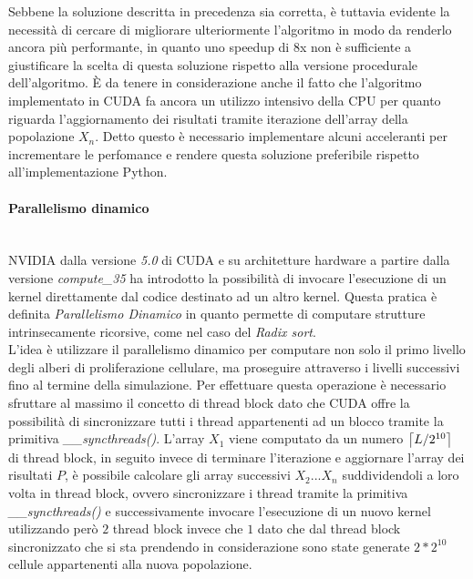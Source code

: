 Sebbene la soluzione descritta in precedenza sia corretta, è tuttavia
evidente la necessità di cercare di migliorare ulteriormente
l'algoritmo in modo da renderlo ancora più performante, in quanto uno
speedup di 8x non è sufficiente a giustificare la scelta di questa soluzione
rispetto alla versione procedurale dell'algoritmo.
È da tenere in considerazione anche il fatto che l'algoritmo implementato
in CUDA fa ancora un utilizzo intensivo della CPU per quanto riguarda
l'aggiornamento dei risultati tramite iterazione dell'array della
popolazione $X_{n}$.
Detto questo è necessario implementare alcuni acceleranti per
incrementare le perfomance e rendere questa soluzione preferibile rispetto
all'implementazione Python.

\paragraph{Parallelismo dinamico}\mbox{}
\\
NVIDIA dalla versione \textit{5.0} di CUDA e su architetture hardware a partire
dalla versione \textit{compute\_35} ha introdotto la possibilità di invocare
l'esecuzione di un kernel direttamente dal codice destinato ad un altro kernel.
Questa pratica è definita
\textit{Parallelismo Dinamico}\cite{jones2012introduction} in quanto permette
di computare strutture intrinsecamente ricorsive, come nel caso del
\textit{Radix sort}\cite{merrill2011high}.
\\
L'idea è utilizzare il parallelismo dinamico per computare non solo il primo
livello degli alberi di proliferazione cellulare, ma proseguire attraverso i
livelli successivi fino al termine della simulazione.
Per effettuare questa operazione è necessario sfruttare al massimo il concetto di
thread block dato che CUDA offre la possibilità di sincronizzare
tutti i thread appartenenti ad un blocco tramite la primitiva
\textit{\_\_syncthreads()}\cite{jones2012introduction}.
L'array $X_{1}$ viene computato da un numero $\ceil*{L/2^{10}}$ di thread block,
in seguito invece di terminare l'iterazione e aggiornare l'array dei risultati
$P$, è possibile calcolare gli array successivi $X_{2}...X_{n}$ suddividendoli
a loro volta in thread block, ovvero sincronizzare i thread tramite la
primitiva \textit{\_\_syncthreads()} e successivamente invocare l'esecuzione di
un nuovo kernel utilizzando però $2$ thread block invece che $1$ dato che dal
thread block sincronizzato che si sta prendendo in considerazione sono state
generate $2 * 2^{10}$ cellule appartenenti alla nuova popolazione.

